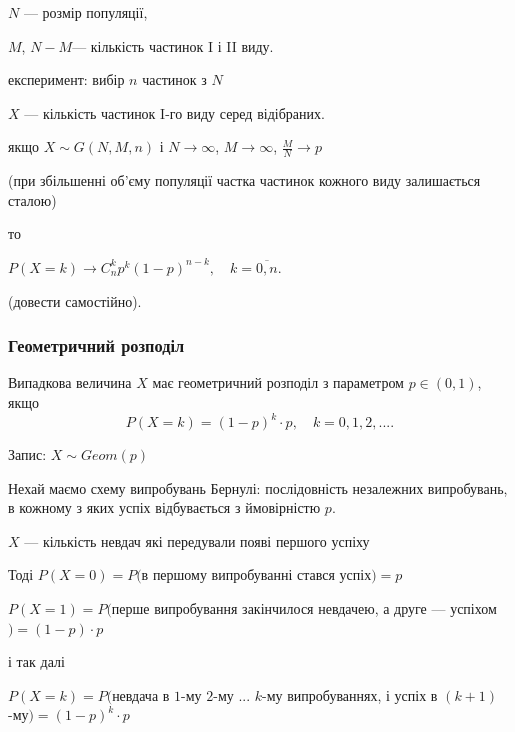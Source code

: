 $N$ --- розмір популяції, 

$M$, $N-M$--- кількість частинок I і II виду.

експеримент: вибір $n$ частинок з $N$

$X$ --- кількість частинок I-го виду серед відібраних.

\begin{claim}
    
\end{claim}


якщо $X \sim G(N, M, n)$ і $N \rightarrow \infty$, $M \rightarrow \infty$,
$\frac{M}{N} \rightarrow p$

(при збільшенні об'єму популяції частка частинок кожного виду залишається сталою)

то

$P(X=k) \rightarrow C_n^k p^k (1-p)^{n-k}, \quad k = \overline{0, n}.$

(довести самостійно).

\subsubsection{Геометричний розподіл}

Випадкова величина $X$ має геометричний розподіл з параметром
$p \in (0, 1)$, якщо 
$$P(X=k) = (1-p)^k \cdot p, \quad k = 0, 1, 2, ....$$

Запис: $X \sim Geom(p)$

Нехай маємо схему випробувань Бернулі:
послідовність незалежних випробувань, в кожному з яких успіх
відбувається з ймовірністю $p$.

$X$ --- кількість невдач які передували появі
першого успіху

Тоді $P(X=0) = P($в першому випробуванні стався успіх$) = p$

$P(X=1) = P($перше випробування закінчилося невдачею, а
друге --- успіхом$) = (1 - p) \cdot p$

і так далі

$P(X=k) = P($невдача в $1$-му $2$-му ...  $k$-му  випробуваннях,
і успіх в $(k+1)$-му$) = (1-p)^k \cdot p$

